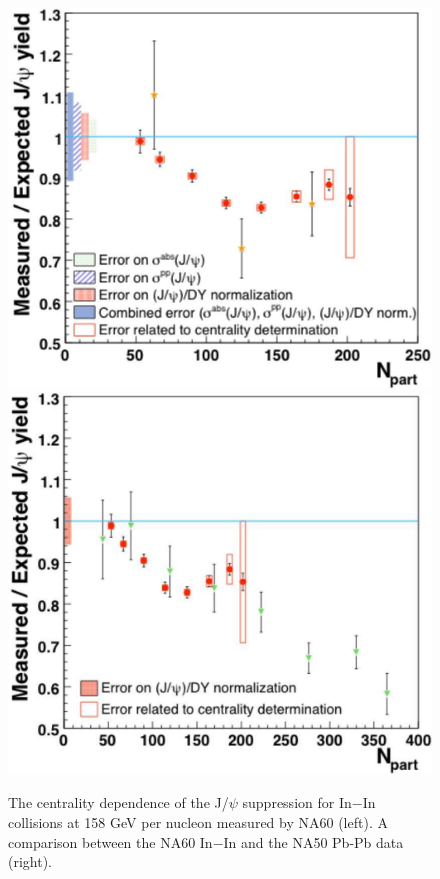 \begin{figure}
  \includegraphics[width=\smallfigwidth]{chap_QuarkoniaSurvey_figures/SPS_217_1}
  \includegraphics[width=\smallfigwidth]{chap_QuarkoniaSurvey_figures/SPS_217_2}
  \caption[JPsiNA50]{The centrality dependence of the J/$\psi$  suppression for In$-$In collisions at 158 GeV per nucleon measured by NA60 (left). 
    A comparison between the NA60 In$-$In and the NA50 Pb-Pb data (right).}
  \label{fig:JPsiAtSPSNA50}
\end{figure}




